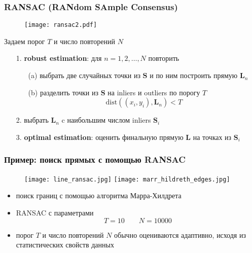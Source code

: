 \documentclass[
    12pt, 
    usepdftitle=false,
    aspectratio=1610
]{beamer}
\begin{document}
\begin{frame}
\frametitle{RANSAC (RANdom SAmple Consensus)}
\begin{figure}
    \centering
    \texttt{[image: ransac2.pdf]}
\end{figure}
Задаем порог $T$ и число повторений $N$
\begin{itemize}
    \item[1.] \textbf{robust estimation}: для $n=1,2,\ldots,N$ повторить
    \begin{itemize}
        \item[(a)] выбрать две случайных точки из $\mathbf{S}$
                   и по ним построить прямую $\mathbf{L}_n$
        \item[(b)] разделить точки из $\mathbf{S}$ на inliers и outliers по порогу $T$
            $$
            \mathrm{dist}\left((x_i,y_i),\mathbf{L}_n\right)<T
            $$
    \end{itemize} 
    \item[2.] выбрать $\mathbf{L}_n$ c наибольшим числом inliers $\mathbf{S}_i$
    \item[3.] \textbf{optimal estimation}: оценить финальную прямую  $\mathbf{L}$ на точках из  $\mathbf{S}_i$
\end{itemize}
\end{frame}

\begin{frame}
\frametitle{Пример: поиск прямых с помощью RANSAC}
\begin{figure}
    \centering
    \texttt{[image: line\_ransac.jpg]}
    \texttt{[image: marr\_hildreth\_edges.jpg]}
\end{figure}
\begin{itemize}
    \item поиск границ с помощью алгоритма Марра-Хилдрета
    \item RANSAC с параметрами
    $$
        T=10\qquad N=10000
    $$
    \item порог $T$ и число повторений $N$ обычно оцениваются адаптивно, исходя из статистических свойств данных
\end{itemize}
\end{frame}

\end{document}
